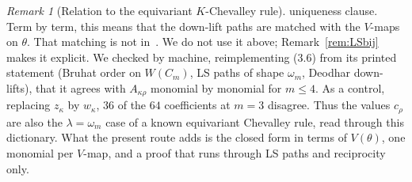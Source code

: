 \documentclass[11pt]{amsart}
\theoremstyle{definition}
\theoremstyle{remark}
\newtheorem{remark}[theorem]{Remark}
\begin{document}
\begin{remark}[Relation to the equivariant $K$-Chevalley rule]
uniqueness clause. Term by term,
this means that the down-lift paths are matched with the $V$-maps on $\theta$. That matching is not
in~\cite{LS12}. We do not use it above; Remark~\ref{rem:LSbij} makes it explicit. We checked by machine, reimplementing (3.6) from its printed
statement (Bruhat order on $W(C_m)$, LS paths of shape $\omega_m$, Deodhar down-lifts), that it agrees with
$A_{\kappa\rho}$ monomial by monomial for $m\le4$. As a control, replacing $z_\kappa$ by $w_\kappa$, $36$ of the
$64$ coefficients at $m=3$ disagree. Thus the values $c_\rho$ are also the $\lambda=\omega_m$ case of a known equivariant
Chevalley rule, read through this dictionary. What the present route adds is the closed form in terms of
$V(\theta)$, one monomial per $V$-map, and a proof that runs through LS paths and reciprocity only.
\end{remark}
\end{document}
